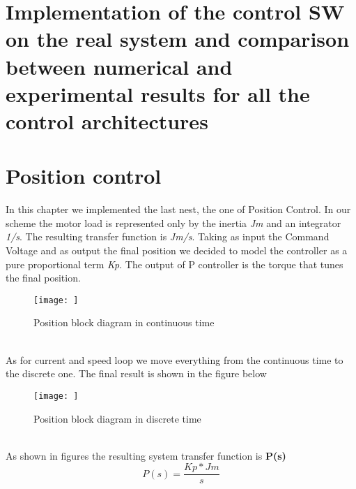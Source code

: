 \documentclass[12pt]{article}
\begin{document}
\section{Implementation of the control SW on the real system and comparison between numerical and experimental results for all the control architectures}




\section{Position control}
In this chapter we implemented the last nest, the one of Position Control.
In our scheme the motor load is represented only by the inertia \textit{Jm} and an integrator \textit{1/s}. The resulting transfer function is \textit{Jm/s}.
Taking as input the Command Voltage and as output the final position we decided to model the controller as a pure proportional term \textit{Kp}.
The output of P controller is the torque that tunes the final position. 

\begin{figure}[h]
	\centering
	\texttt{[image: ]}
	\caption{Position block diagram in continuous time}
\end{figure}\\


As for current and speed loop we move everything from the continuous time to the discrete one. The final result is shown in the figure below

\begin{figure}[h]
	\centering
	\texttt{[image: ]}
	\caption{Position block diagram in discrete time}
\end{figure}\\


As shown in figures the resulting system transfer function is \textbf{P(s)}
\begin{equation}
P(s) = \dfrac{Kp*Jm}{s}
\end{equation}
\end{document}

